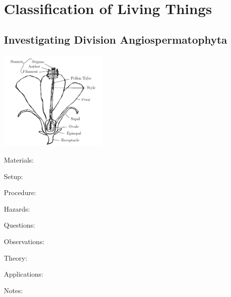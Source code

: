 \section{Classification of Living Things}

\begin{multicols}{2}




\subsection{Investigating Division Angiospermatophyta} %

\begin{center}
\includegraphics[width=0.4\textwidth]{./img/class-div-angio.png}
\end{center}

\begin{description*}
\item[Materials:]{}
\item[Setup:]{}
\item[Procedure:]{}
\item[Hazards:]{}
\item[Questions:]{}
\item[Observations:]{}
\item[Theory:]{}
\item[Applications:]{}
\item[Notes:]{}
\end{description*}



\end{multicols}

\pagebreak